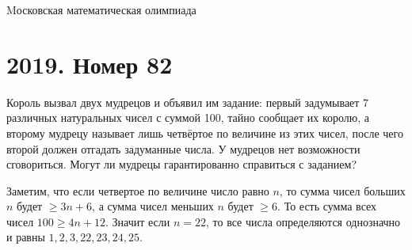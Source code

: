 \documentclass[11pt, a4paper]{common/document_template}
\begin{document}
\begin{titlepage}
  \begin{center}
	\Huge{Mосковская математическая олимпиада}
  \end{center}
\end{titlepage}

\chapter{2019. Номер 82}

\begin{exercise}
Король вызвал двух мудрецов и объявил им задание: первый задумывает 7 различных натуральных чисел с суммой 100, тайно сообщает их королю, а второму мудрецу называет лишь четвёртое по величине из этих чисел, после чего второй должен отгадать задуманные числа. У мудрецов нет возможности сговориться. Могут ли мудрецы гарантированно справиться с заданием?
\end{exercise}

\begin{Solution}
Заметим, что если четвертое по величине число равно $n$, то сумма чисел больших $n$ будет $\geqslant 3n + 6$, а сумма чисел меньших $n$ будет $\geqslant 6$. То есть сумма всех чисел $100 \geqslant 4n + 12$. Значит если $n = 22$, то все числа определяются однозначно и равны $1, 2, 3, 22, 23, 24, 25$.
\end{Solution}
\end{document}
